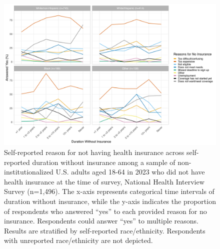 \documentclass[12pt]{article}
\begin{document}
\begin{figure}[H]
  \centering
  \includegraphics[width=15cm]{figures/duration_no_insurance_by_reason_by_race.png}
  \caption{Self-reported reason for not having health insurance across self-reported duration without insurance among a sample of non-institutionalized U.S. adults aged 18-64 in 2023 who did not have health insurance at the time of survey, National Health Interview Survey (n=1,496). The x-axis represents categorical time intervals of duration without insurance, while the y-axis indicates the proportion of respondents who answered “yes” to each provided reason for no insurance. Respondents could answer “yes” to multiple reasons. Results are stratified by self-reported race/ethnicity. Respondents with unreported race/ethnicity are not depicted.}
\end{figure}
\end{document}
